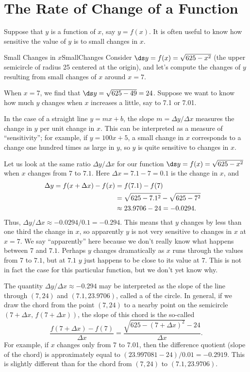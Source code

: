 \section{The Rate of Change of a Function}\label{sec:Slope}

Suppose that $y$ is a function of $x$, say $y = f(x)$.
It is often useful to know how sensitive the value of $y$
is to small changes in $x$.

\begin{example}{Small Changes in $x$}{SmallChanges}
Consider  $\ds y=f(x)=\sqrt{625-x^2}$ (the upper semicircle of radius
25 centered at the origin), and let's compute the changes of $y$ 
resulting from small changes of $x$ around $x=7$.
\end{example}

\begin{solution} 
When $x=7$, we find that $\ds y=\sqrt{625-49}=24$.
Suppose we want to know how much $y$ changes when $x$ increases a little,
say to 7.1 or 7.01.

In the case of a straight line $y=mx+b$, the slope $m=\Delta y/\Delta
x$ measures the change in $y$ per unit change in $x$. This can be
interpreted as a measure of ``sensitivity''; for example, if
$y=100x+5$, a small change in $x$ corresponds to a change one hundred
times as large in $y$, so $y$ is quite sensitive to changes in $x$.

Let us look at the same ratio $\Delta y/\Delta x$ for our function
$\ds y=f(x)=\sqrt{625-x^2}$ when $x$ changes from 7 to $7.1$.  Here $\Delta
x=7.1-7=0.1$ is the change in $x$, and
\begin{align*}
\Delta y =f(x+\Delta x)-f(x)&=f(7.1)-f(7)\cr
         &=\sqrt{625-7.1^2}-\sqrt{625-7^2}\cr
	 & \approx 23.9706-24=-0.0294.\cr
\end{align*}
Thus, $\Delta y/\Delta x\approx -0.0294/0.1=-0.294$. This means that $y$
changes by less than one third the change in $x$, so apparently $y$ is
not very sensitive to changes in $x$ at $x=7$. We say ``apparently''
here because we don't really know what happens between 7 and
$7.1$. Perhaps $y$ changes dramatically as $x$ runs through the values
from 7 to $7.1$, but at $7.1$ $y$ just happens to be close to its
value at $7$. This is not in fact the case for this particular
function, but we don't yet know why.
\end{solution}

The quantity $\Delta y/\Delta x\approx -0.294$ may be interpreted as 
the slope of the line through $(7,24)$ and
$(7.1,23.9706)$, called a  of the circle.
In general, if we draw the chord from the point $(7,24)$ to a nearby
point on the semicircle $(7+\Delta x,\,f(7+\Delta x))$, the slope of this
chord is the so-called 
$$
\frac{f(7+\Delta x)-f(7)}{\Delta x}=
\frac{\sqrt{625-(7+\Delta x)^2}-24}{\Delta x}.
$$
For example, if $x$ changes only from 7 to 7.01, then the
difference quotient (slope of the chord) is approximately equal to
$(23.997081-24)/0.01=-0.2919$.  This is slightly different than for the
chord from $(7,24)$ to $(7.1,23.9706)$.


